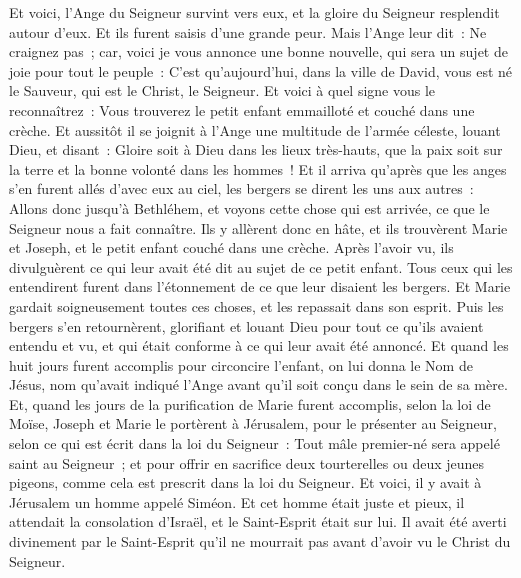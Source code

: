 \begin{multicols}{2}
Et voici, l'Ange du Seigneur survint vers eux, et la gloire du Seigneur resplendit autour d'eux. Et ils furent saisis d'une grande peur.
Mais l'Ange leur dit~: Ne craignez pas~; car, voici je vous annonce une bonne nouvelle, qui sera un sujet de joie pour tout le peuple~:
C'est qu'aujourd'hui, dans la ville de David, vous est né le Sauveur, qui est le Christ, le Seigneur.
Et voici à quel signe vous le reconnaîtrez~: Vous trouverez le petit enfant emmailloté et couché dans une crèche.
Et aussitôt il se joignit à l'Ange une multitude de l'armée céleste, louant Dieu, et disant~:
Gloire soit à Dieu dans les lieux très-hauts, que la paix soit sur la terre et la bonne volonté dans les hommes~!
Et il arriva qu'après que les anges s'en furent allés d'avec eux au ciel, les bergers se dirent les uns aux autres~: Allons donc jusqu'à Bethléhem, et voyons cette chose qui est arrivée, ce que le Seigneur nous a fait connaître.
Ils y allèrent donc en hâte, et ils trouvèrent Marie et Joseph, et le petit enfant couché dans une crèche.
Après l'avoir vu, ils divulguèrent ce qui leur avait été dit au sujet de ce petit enfant.
Tous ceux qui les entendirent furent dans l'étonnement de ce que leur disaient les bergers.
Et Marie gardait soigneusement toutes ces choses, et les repassait dans son esprit.
Puis les bergers s'en retournèrent, glorifiant et louant Dieu pour tout ce qu'ils avaient entendu et vu, et qui était conforme à ce qui leur avait été annoncé.
Et quand les huit jours furent accomplis pour circoncire l'enfant, on lui donna le Nom de Jésus, nom qu'avait indiqué l'Ange avant qu'il soit conçu dans le sein de sa mère.
Et, quand les jours de la purification de Marie furent accomplis, selon la loi de Moïse, Joseph et Marie le portèrent à Jérusalem, pour le présenter au Seigneur,
selon ce qui est écrit dans la loi du Seigneur~: Tout mâle premier-né sera appelé saint au Seigneur~; 
et pour offrir en sacrifice deux tourterelles ou deux jeunes pigeons, comme cela est prescrit dans la loi du Seigneur.
Et voici, il y avait à Jérusalem un homme appelé Siméon. Et cet homme était juste et pieux, il attendait la consolation d'Israël, et le Saint-Esprit était sur lui.
Il avait été averti divinement par le Saint-Esprit qu'il ne mourrait pas avant d'avoir vu le Christ du Seigneur.

\end{multicols}
